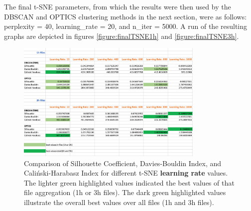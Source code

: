 
The final t-SNE parameters, from which the results were then used by the DBSCAN and OPTICS clustering methods in the next section, were as follows: perplexity = 40, learning\_rate = 20, and n\_iter = 5000. A run of the resulting graphs are depicted in figures \ref{figure:finalTSNE1h} and \ref{figure:finalTSNE3h}.


\begin{figure}
  \centering
  \includegraphics[width=0.8\textwidth]{./images/tsneParametersTest/learningRate/learningRateEvaluationScores.png}
  \caption{Comparison of Silhouette Coefficient, Davies-Bouldin Index, and Caliński-Harabasz Index for different t-SNE \textbf{learning rate} values. The lighter green highlighted values indicated the best values of that file aggregation (1h or 3h files). The dark green highlighted values illustrate the overall best values over all files (1h and 3h files).}
  \label{figure:learningRateEvaluationScores}
\end{figure}



